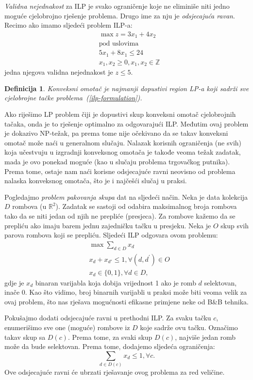 \documentclass[a4paper, utf8, 11pt, colorlinks]{article}
\newtheorem{definition}{Definicija}
\begin{document}
\emph{Validna nejednakost} za ILP je svako ograničenje koje ne eliminiše niti jedno moguće cjelobrojno rješenje problema. Drugo ime za nju je \emph{odsjecajuća ravan}.
Recimo ako imamo sljedeći problem ILP-a:
\begin{align*}
    &\max z = 3x_1 + 4 x_2 \\
    &\mbox{pod uslovima } \\
    &5x_1 + 8x_1 \leq 24 \\
    & x_1, x_2 \geq 0, x_1,x_2\in \mathbb{Z}
\end{align*}
jedna njegova validna nejednakost je $z \leq 5$. 

\begin{definition}
      Konveksni omotač je najmanji dopustivi region LP-a koji sadrži sve cjelobrojne tačke problema~(\ref{ilp-formulation}).
\end{definition}
Ako riješimo LP problem čiji je dopustivi skup konveksni omotač cjelobrojnih tačaka, onda je to rješenje optimalno za odgovarajući ILP. Međutim ovaj problem je dokazivo NP-težak, pa prema tome nije očekivano da se takav konveksni omotač može naći u generalnom slučaju. Nalazak korisnih ograničenja (ne svih) koja učestvuju u izgradnji konveksnog omotača je takođe veoma težak zadatak, mada je ovo ponekad moguće (kao u slučaju problema trgovačkog putnika). Prema tome, ostaje nam naći korisne odsjecajuće ravni neovisno od problema nalaska konveksnog omotača, što je i najčešći slučaj u praksi. 

Pogledajmo   \emph{problem pakovanja skupa} dat na sljedeći način. Neka je data kolekcija $D$ rombova (u $\mathbb{R}^2$). 
Zadatak se sastoji od odabira maksimalnog broja rombova tako da se niti jedan od njih ne prepliće (presjeca).  Za rombove kažemo da se prepliću ako imaju barem jednu zajedničku tačku u presjeku. 
Neka je $O$ skup svih parova rombova koji se prepliću. Sljedeći ILP odgovara ovom problemu:
\begin{align*}
    &\max \sum_{d\in D}x_d\\
    & x_d + x_{d'} \leq 1, \forall (d, d^{'}) \in O \\
    & x_d \in \{0,1\}, \forall d \in D,
\end{align*}
gdje je $x_d$ binaran varijabla koja dobija vrijednost 1 ako je romb $d$ selektovan, inače 0. 
Kao što vidimo, broj binarnih varijabli u praksi može biti veoma velik za ovaj problem, što nas rješava mogućnosti efikasne primjene neke od B\&B tehnika.

Pokušajmo dodati odsjecajuće ravni u prethodni ILP. Za svaku tačku $c$, enumerišimo sve one (moguće) rombove iz $D$ koje sadrže ovu tačku. Označimo takav skup sa $D(c)$. Prema tome, za svaki skup $D(c)$, najviše jedan romb može da bude selektovan. Prema tome, dodajemo sljedeća ograničenja:
\begin{equation}
     \sum_{d \in D(c)} x_d \leq 1, \forall c.
\end{equation}
Ove odsjecajuće ravni će ubrzati rješavanje ovog problema za   red veličine.
\end{document}
